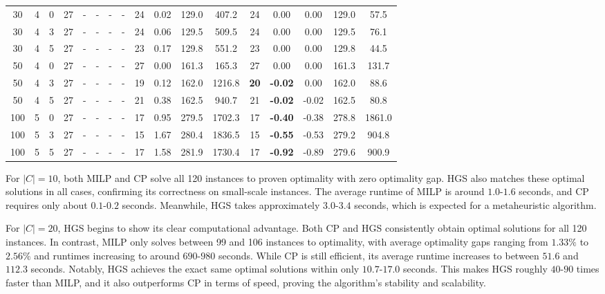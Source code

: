 \documentclass[3p, authoryear, 11pt]{elsarticle}
\begin{document}
\begin{table}[H]
\begin{tabular}{cccc cccc cccc ccccc}
    
    30 & 4 & 0 & 27 & - & - & - & - & 24 & 0.02 & 129.0 & 407.2 & 24 & 0.00 & 0.00 & 129.0 & 57.5 \\
    30 & 4 & 3 & 27 & - & - & - & - & 24 & 0.06 & 129.5 & 509.5 & 24 & 0.00 & 0.00 & 129.5 & 76.1 \\
    30 & 4 & 5 & 27 & - & - & - & - & 23 & 0.17 & 129.8 & 551.2 & 23 & 0.00 & 0.00 & 129.8 & 44.5 \\
    \midrule
    
    50 & 4 & 0 & 27 & - & - & - & - & 27 & 0.00 & 161.3 & 165.3 & 27 & 0.00 & 0.00 & 161.3 & 131.7 \\
    50 & 4 & 3 & 27 & - & - & - & - & 19 & 0.12 & 162.0 & 1216.8 & \textbf{20} & \textbf{-0.02} & 0.00 & 162.0 & 88.6 \\
    50 & 4 & 5 & 27 & - & - & - & - & 21 & 0.38 & 162.5 & 940.7 & 21 & \textbf{-0.02} & -0.02 & 162.5 & 80.8 \\
    \midrule
    
    100 & 5 & 0 & 27 & - & - & - & - & 17 & 0.95 & 279.5 & 1702.3 & 17 & \textbf{-0.40} & -0.38 & 278.8 & 1861.0 \\
    100 & 5 & 3 & 27 & - & - & - & - & 15 & 1.67 & 280.4 & 1836.5 & 15 & \textbf{-0.55} & -0.53 & 279.2 & 904.8 \\
    100 & 5 & 5 & 27 & - & - & - & - & 17 & 1.58 & 281.9 & 1730.4 & 17 & \textbf{-0.92} & -0.89 & 279.6 & 900.9 \\
    \bottomrule
    \end{tabular}   
\end{table}

For $|C|=10$, both MILP and CP solve all 120 instances to proven optimality with zero optimality gap. HGS also matches these optimal solutions in all cases, confirming its correctness on small-scale instances. The average runtime of MILP is around $1.0$-$1.6$ seconds, and CP requires only about $0.1$-$0.2$ seconds. Meanwhile, HGS takes approximately $3.0$-$3.4$ seconds, which is expected for a metaheuristic algorithm.

For $|C|=20$, HGS begins to show its clear computational advantage. Both CP and HGS consistently obtain optimal solutions for all 120 instances. In contrast, MILP only solves between 99 and 106 instances to optimality, with average optimality gaps ranging from $1.33\%$ to $2.56\%$ and runtimes increasing to around $690$-$980$ seconds. While CP is still efficient, its average runtime increases to between $51.6$ and $112.3$ seconds. Notably, HGS achieves the exact same optimal solutions within only $10.7$-$17.0$ seconds. This makes HGS roughly $40$-$90$ times faster than MILP, and it also outperforms CP in terms of speed, proving the algorithm's stability and scalability.
\end{document}
